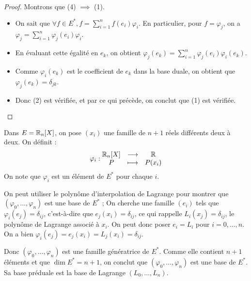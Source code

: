 \documentclass[11pt,a4paper]{report}
\begin{document}
\begin{proof}
    Montrons que (4) $\implies$ (1).
    \begin{itemize}
        \item On sait que $\forall f \in E^*, f = \sum_{i=1}^n f(e_i) \varphi_i$. En particulier, pour $f = \varphi_j$, on a $\varphi_j = \sum_{i=1}^n \varphi_j(e_i) \varphi_i$.
        \item En évaluant cette égalité en $e_k$, on obtient $\varphi_j(e_k) = \sum_{i=1}^n \varphi_j(e_i) \varphi_i(e_k)$.
        \item Comme $\varphi_i(e_k)$ est le coefficient de $e_k$ dans la base duale, on obtient que $\varphi_j(e_k) = \delta_{jk}$.
        \item Donc (2) est vérifiée, et par ce qui précède, on conclut que (1) est vérifiée.
    \end{itemize}
\end{proof}

\begin{example}
    Dans $E = \mathbb{R}_n[X]$, on pose $(x_i)$ une famille de $n+1$ réels différents deux à deux. On définit :
    $$\varphi_i : \begin{matrix} \mathbb{R}_n[X] & \longrightarrow & \mathbb{R} \\ P & \longmapsto & P(x_i) \end{matrix}$$
    On note que $\varphi_i$ est un élément de $E^*$ pour chaque $i$.

    On peut utiliser le polynôme d'interpolation de Lagrange pour montrer que $(\varphi_0, \dots, \varphi_n)$ est une base de $E^*$ ; On cherche une famille $(e_i)$ tels que $\varphi_i(e_j) = \delta_{ij}$, c'est-à-dire que $e_j(x_i) = \delta_{ij}$, ce qui rappelle $L_i(x_j) = \delta_{ij}$, le polynôme de Lagrange associé à $x_i$. On peut donc poser $e_i = L_i$ pour $i=0,\dots,n$. On a bien $\varphi_i(e_j) = e_j(x_i) = L_j(x_i) = \delta_{ij}$.

    Donc $(\varphi_0, \dots, \varphi_n)$ est une famille génératrice de $E^*$. Comme elle contient $n+1$ éléments et que $\dim E^* = n+1$, on conclut que $(\varphi_0, \dots, \varphi_n)$ est une base de $E^*$. Sa base préduale est la base de Lagrange $(L_0, \dots, L_n)$.
\end{example}
\end{document}
